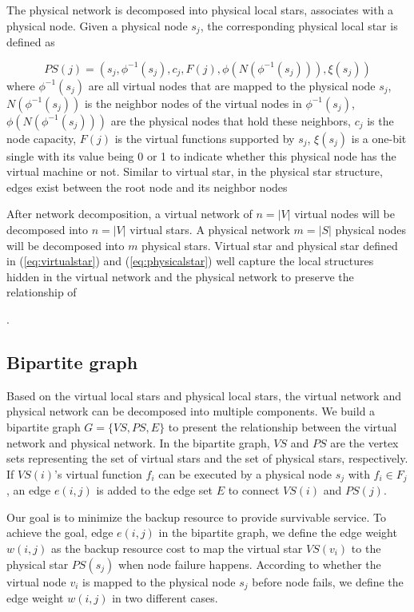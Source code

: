 The physical network is decomposed into physical local stars,  associates with a physical node. Given a physical node $s_j$, the corresponding physical local star is defined as 

\begin{equation}
PS(j)=(s_j, \phi^{-1}( s_j), c_j, F(j), \phi(N(\phi^{-1}( s_j))), \xi(s_j))
\label{eq:physicalstar}
\end{equation}
where $\phi^{-1}( s_j) $ are all virtual nodes that are mapped to the physical node $s_j$, $N(\phi^{-1}( s_j))$ is the neighbor nodes of the virtual nodes in $\phi^{-1}( s_j)$, $\phi(N(\phi^{-1}( s_j)))$ are the physical nodes that hold these neighbors, $c_j$ is the node capacity, $F(j)$ is the virtual functions supported by $s_j$,  $\xi(s_j)$ is a one-bit single with its value being 0 or 1 to indicate whether this physical node has  the virtual machine or not. Similar to virtual star, in the physical star structure, edges exist between the root node and its neighbor nodes 

After network decomposition, a virtual network  of $n=|V|$ virtual nodes will be decomposed into $n=|V|$ virtual stars. A physical network  $m=|S|$ physical nodes will be decomposed into $m$ physical stars. Virtual star and physical star defined in (\ref{eq:virtualstar}) and (\ref{eq:physicalstar})  well capture the local structures hidden in the virtual network and the physical network to preserve the relationship of 

.
\subsection{Bipartite graph}
Based on the virtual local stars and physical local stars,   the virtual network and physical network can be decomposed into multiple components.
We build a bipartite graph $G=\{VS,PS,E\}$ to present the relationship between the virtual network and physical network. In the bipartite graph,
$VS$ and $PS$ are the vertex sets  representing the set of virtual stars and the set of physical stars, respectively. If $VS(i)$'s virtual function $f_i$ can be executed by a physical node $s_j$ with ${f_i} \in {F_j}$, an edge $e(i,j)$ is added to the edge set $E$ to connect $VS(i)$ and $PS(j)$.

Our goal is to minimize the backup resource to provide survivable service. To achieve the goal,  edge $e(i,j)$ in the bipartite graph, we define the edge weight $w(i,j)$  as the backup resource cost to map the virtual star $VS(v_i)$ to the physical star $PS(s_j)$ when  node failure happens. According to whether the virtual node $v_i$ is mapped to the physical node $s_j$ before node fails, we define the edge weight $w(i,j)$ in two different cases.

